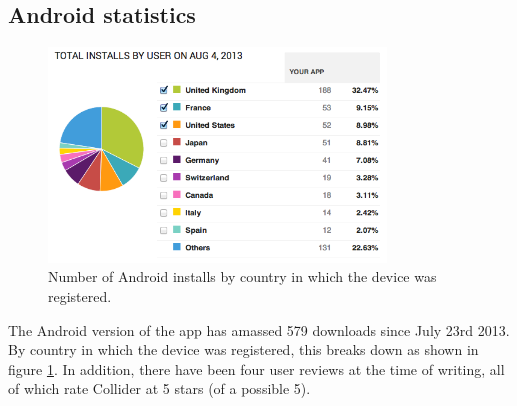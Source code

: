 \documentclass[12pt]{article}
\begin{document}
\subsection{Android statistics}
\begin{figure}
\centering
    \includegraphics[width=0.8\textwidth]{img/androidcountries.png}
    \caption{\label{fig:androidcountries}Number of Android installs by country in which the device was registered.}
\end{figure}
The Android version of the app has amassed 579 downloads since July 23rd 2013. By country in which the device was registered, this breaks down as shown in figure \ref{fig:androidcountries}.
In addition, there have been four user reviews at the time of writing, all of which rate Collider at 5 stars (of a possible 5).
\end{document}
